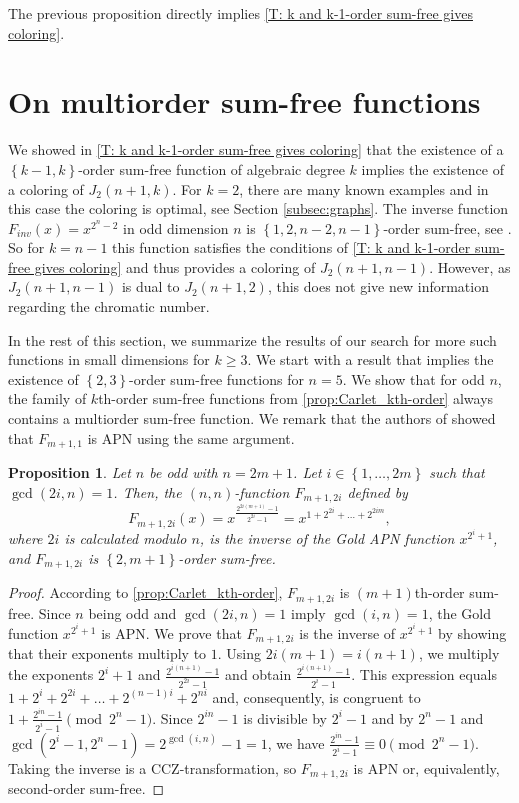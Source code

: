 \documentclass[12pt]{article}
\newtheorem{prop}[thm]{Proposition}
\theoremstyle{definition}
\newcommand{\set}[1]{\left\{#1\right\}}
\newcounter{numb}
\begin{document}
The previous proposition directly implies \cref{T: k and k-1-order sum-free gives coloring}.




\section{On multiorder sum-free functions}
\label{sec: multiorder sum-free functions}

We showed in \cref{T: k and k-1-order sum-free gives coloring} that the existence of a $\set{k-1,k}$-order sum-free function of algebraic degree $k$ implies the existence of a coloring of $J_2(n+1,k)$.
For $k=2$, there are many known examples \cite{heering2025lineparallelismspgn2preparatalike} and in this case the coloring is optimal, see Section \ref{subsec:graphs}.
The inverse function $F_{inv}(x) = x^{2^n-2}$ in odd dimension $n$ is $ \set{1, 2,n-2,n-1}$-order sum-free, see \cite{carlet2025inverse}. 
So for $k=n-1$ this function satisfies the conditions of \cref{T: k and k-1-order sum-free gives coloring} and thus provides a coloring of $J_2(n+1,n-1)$. However, as $J_2(n+1,n-1)$ is dual to $J_2(n+1,2)$, this does not give new information regarding the chromatic number.


In the rest of this section, we summarize the results of our search for more such functions in small dimensions for $k\geq 3$. We start with a result that implies the existence of $\set{2,3}$-order sum-free functions for $n=5$. We show that for odd $n$, the family of $k$th-order sum-free functions from \cref{prop:Carlet_kth-order} always contains a multiorder sum-free function. We remark that the authors of \cite{blondeau2011} showed that $F_{m+1,1}$ is APN using the same argument.

\begin{prop}
\label{th:multiorder_carlet}
	Let $n$ be odd with $n=2m+1$. Let $i \in \set{1,\dots,2m}$ such that $\gcd(2i,n) = 1$. Then, the $(n,n)$-function $F_{m+1,2i}$ defined by
	\[
		F_{m+1,2i}(x) = x^\frac{2^{2i(m+1)}-1}{2^{2i}-1} = x^{1+2^{2i}+\dots+2^{2im}},
	\]
	where $2i$ is calculated modulo $n$, is the inverse of the Gold APN function $x^{2^i+1}$, and $F_{m+1,2i}$ is $\set{2,m+1}$-order sum-free.
\end{prop}

\begin{proof}
	According to \cref{prop:Carlet_kth-order}, $F_{m+1,2i}$ is $(m+1)$th-order sum-free. Since $n$ being odd and $\gcd(2i,n) = 1$ imply $\gcd(i,n) = 1$, the Gold function $x^{2^i+1}$ is APN. We prove that $F_{m+1,2i}$ is the inverse of $x^{2^i+1}$ by showing that their exponents multiply to $1$. Using $2i(m+1) = i(n+1)$, we multiply the exponents $2^i+1$ and $\frac{2^{i(n+1)}-1}{2^{2i}-1}$ and obtain $\frac{2^{i(n+1)}-1}{2^i-1}$. This expression equals $1 + 2^i +2^{2i} + \dots + 2^{(n-1)i} + 2^{ni}$ and, consequently, is congruent to $1 + \frac{2^{in}-1}{2^i-1} \pmod{2^n-1}.$ Since $2^{in}-1$ is divisible by $2^i-1$ and by $2^n-1$ and $\gcd(2^i-1,2^n-1)=2^{\gcd(i,n)}-1=1$, we have $\frac{2^{in}-1}{2^i-1} \equiv 0 \pmod{2^n-1}$. Taking the inverse is a CCZ-transformation, so $F_{m+1,2i}$ is APN or, equivalently, second-order sum-free.
\end{proof}
\end{document}

